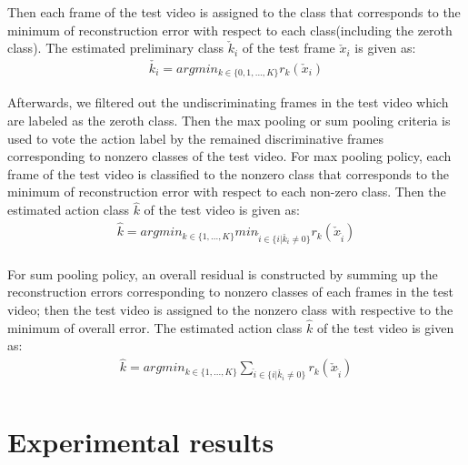 \documentclass{article}
\begin{document}
Then each frame of the test video is assigned to the class that corresponds to
the minimum of reconstruction error with respect to each class(including the zeroth class).
The estimated preliminary class  $\check{k}_i$ of the test frame $\check{x}_{i}$ is given as:
 \begin{equation} \label{eq5}
 \begin{aligned}
\check{k_i}=argmin_{k\in \{0,1,...,K\}} r_{k}(\check{x}_{i})
\end{aligned}
\end{equation}


 Afterwards, we  filtered out the undiscriminating frames in the test video which are labeled as the zeroth class.
Then the max pooling or sum pooling criteria is used  to vote the action label by the remained discriminative frames corresponding to nonzero classes of the test video.
For max pooling policy, each frame of the test video is classified to the nonzero class that corresponds to
the minimum of reconstruction error with respect to each non-zero class.
Then the estimated action class  $\hat{k}$ of the test video is given as:
 \begin{equation} \label{eq5}
 \begin{aligned}
\hat{k}=argmin_{k\in \{1,...,K\}}min_{\hat{i} \in \{i| \check{k_i} \neq 0  \}} r_{k}(\check{x}_{\hat{i}})    \\
\end{aligned}
\end{equation}

For sum pooling policy, an overall residual is constructed by summing up the reconstruction errors corresponding to nonzero classes of each frames in  the test video;
then the test video is assigned to the nonzero class with respective to the minimum of overall error.
The estimated action class  $\hat{k}$ of the test video is given as:
 \begin{equation} \label{eq5}
 \begin{aligned}
\hat{k}=argmin_{k\in \{1,...,K\}}\sum_{\hat{i} \in \{i| \check{k_i} \neq 0  \}} r_{k}(\check{x}_{\hat{i}})   \\
\end{aligned}
\end{equation}





\section{Experimental results}
\end{document}
